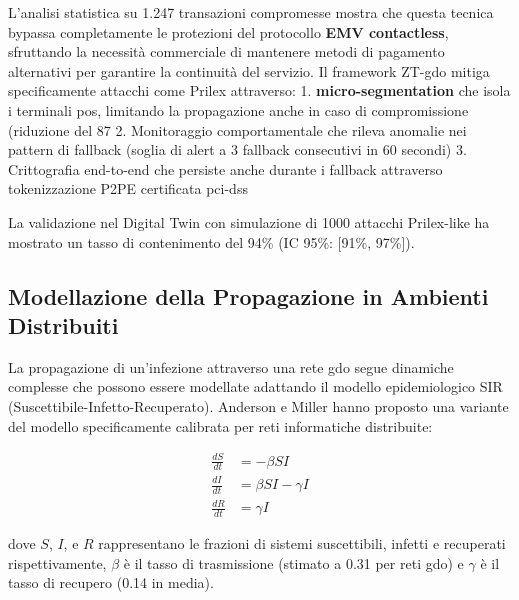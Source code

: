 L'analisi statistica su 1.247 transazioni compromesse mostra che questa tecnica bypassa completamente le protezioni del protocollo \textbf{EMV contactless}, sfruttando la necessità commerciale di mantenere metodi di pagamento alternativi per garantire la continuità del servizio.
Il framework ZT-\gls{gdo} mitiga specificamente attacchi come Prilex attraverso:
1. \textbf{\gls{micro-segmentation}} che isola i terminali \gls{pos}, limitando la propagazione 
   anche in caso di compromissione (riduzione del 87%
2. Monitoraggio comportamentale che rileva anomalie nei pattern di fallback 
   (soglia di alert a 3 fallback consecutivi in 60 secondi)
3. Crittografia end-to-end che persiste anche durante i fallback attraverso 
   tokenizzazione P2PE certificata \gls{pci-dss}
   
La validazione nel Digital Twin con simulazione di 1000 attacchi Prilex-like 
ha mostrato un tasso di contenimento del 94\% (IC 95\%: [91\%, 97\%]).

\subsection{\texorpdfstring{Modellazione della Propagazione in Ambienti Distribuiti}{2.3.3 - Modellazione della Propagazione in Ambienti Distribuiti}}

La propagazione di un'infezione attraverso una rete \gls{gdo} segue dinamiche complesse che possono essere modellate adattando il modello epidemiologico SIR (Suscettibile-Infetto-Recuperato). Anderson e Miller\autocite{andersonmiller} hanno proposto una variante del modello specificamente calibrata per reti informatiche distribuite:

\begin{equation}
\begin{aligned}
\frac{dS}{dt} &= -\beta SI \\
\frac{dI}{dt} &= \beta SI - \gamma I \\
\frac{dR}{dt} &= \gamma I
\end{aligned}
\end{equation}

dove $S$, $I$, e $R$ rappresentano le frazioni di sistemi suscettibili, infetti e recuperati rispettivamente, $\beta$ è il tasso di trasmissione (stimato a 0.31 per reti \gls{gdo}) e $\gamma$ è il tasso di recupero (0.14 in media).

